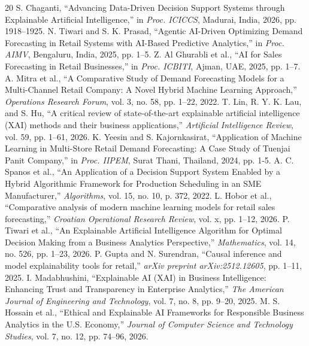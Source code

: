 \documentclass[conference]{IEEEtran}
\begin{document}
\begin{thebibliography}{20}
 S. Chaganti, ``Advancing Data-Driven Decision Support Systems through Explainable Artificial Intelligence,'' in \emph{Proc. ICICCS}, Madurai, India, 2026, pp. 1918--1925.
 N. Tiwari and S. K. Prasad, ``Agentic AI-Driven Optimizing Demand Forecasting in Retail Systems with AI-Based Predictive Analytics,'' in \emph{Proc. AIMV}, Bengaluru, India, 2025, pp. 1--5.
 Z. Al Ghurabli et al., ``AI for Sales Forecasting in Retail Businesses,'' in \emph{Proc. ICBITI}, Ajman, UAE, 2025, pp. 1--7.
 A. Mitra et al., ``A Comparative Study of Demand Forecasting Models for a Multi-Channel Retail Company: A Novel Hybrid Machine Learning Approach,'' \emph{Operations Research Forum}, vol. 3, no. 58, pp. 1--22, 2022.
 T. Lin, R. Y. K. Lau, and S. Hu, ``A critical review of state-of-the-art explainable artificial intelligence (XAI) methods and their business applications,'' \emph{Artificial Intelligence Review}, vol. 59, pp. 1--61, 2026.
 K. Yeesin and S. Kajornkasirat, ``Application of Machine Learning in Multi-Store Retail Demand Forecasting: A Case Study of Tuenjai Panit Company,'' in \emph{Proc. IIPEM}, Surat Thani, Thailand, 2024, pp. 1-5.
 A. C. Spanos et al., ``An Application of a Decision Support System Enabled by a Hybrid Algorithmic Framework for Production Scheduling in an SME Manufacturer,'' \emph{Algorithms}, vol. 15, no. 10, p. 372, 2022.
 L. Hobor et al., ``Comparative analysis of modern machine learning models for retail sales forecasting,'' \emph{Croatian Operational Research Review}, vol. x, pp. 1--12, 2026.
 P. Tiwari et al., ``An Explainable Artificial Intelligence Algorithm for Optimal Decision Making from a Business Analytics Perspective,'' \emph{Mathematics}, vol. 14, no. 526, pp. 1--23, 2026.
 P. Gupta and N. Surendran, ``Causal inference and model explainability tools for retail,'' \emph{arXiv preprint arXiv:2512.12605}, pp. 1--11, 2025.
 I. Madabhushini, ``Explainable AI (XAI) in Business Intelligence: Enhancing Trust and Transparency in Enterprise Analytics,'' \emph{The American Journal of Engineering and Technology}, vol. 7, no. 8, pp. 9–20, 2025.
 M. S. Hossain et al., ``Ethical and Explainable AI Frameworks for Responsible Business Analytics in the U.S. Economy,'' \emph{Journal of Computer Science and Technology Studies}, vol. 7, no. 12, pp. 74–96, 2026.

\end{thebibliography}
\end{document}

